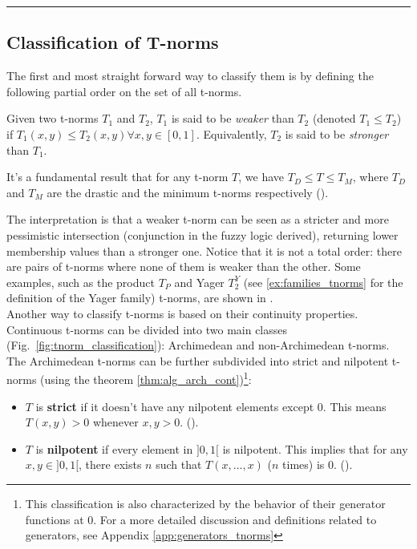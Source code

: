\noindent\rule{\textwidth}{2pt}


\subsection{Classification of T-norms}\label{sec:class_tnorms}
The first and most straight forward way to classify them is by defining the following partial order on the set of all t-norms. 
\begin{definition}\label{def:weaker}
  Given two t-norms $T_1$ and $T_2$, $T_1$ is said to be \emph{weaker} than $T_2$ (denoted $T_1 \leq T_2$) if $T_1(x,y) \leq T_2(x,y) \forall x,y \in [0,1]$.
  Equivalently, $T_2$ is said to be \emph{stronger} than $T_1$.
\end{definition}

\begin{remark}
  It's a fundamental result that for any t-norm $T$, we have $T_D \leq T \leq T_M$, where $T_D$ and $T_M$ are the drastic and the minimum t-norms respectively (\cite[Rem.~1.5]{Klement2000}).
\end{remark}

The interpretation is that a weaker t-norm can be seen as a stricter and more pessimistic intersection (conjunction in the fuzzy logic derived), returning lower membership values than a stronger one. Notice that it is not a total order: there are pairs of t-norms where none of them is weaker than the other. Some examples, such as the product $T_P$ and Yager $T_2^Y$ (see \ref{ex:families_tnorms} for the definition of the Yager family) t-norms, are shown in \cite[Fig.~6.1]{Klement2000}.\\


Another way to classify t-norms is based on their continuity properties. Continuous t-norms can be divided into two main classes (Fig.~\ref{fig:tnorm_classification}): Archimedean and non-Archimedean t-norms. The Archimedean t-norms can be further subdivided into strict and nilpotent t-norms (using the theorem \ref{thm:alg_arch_cont})\footnote{This classification is also characterized by the behavior of their generator functions at 0. For a more detailed discussion and definitions related to generators, see Appendix \ref{app:generators_tnorms}}:

\begin{itemize}
    \item $T$ is \textbf{strict} if it doesn't have any nilpotent elements except $0$. This means $T(x,y)>0$ whenever $x,y > 0$. (\cite[Cor.~3.30(i)]{Klement2000}).
    \item $T$ is \textbf{nilpotent} if every element in $]0,1[$ is nilpotent. This implies that for any $x,y \in ]0,1[$, there exists $n$ such that $T(x, \dots, x)$ ($n$ times) is $0$. (\cite[Cor.~3.30(ii)]{Klement2000}).
\end{itemize}


